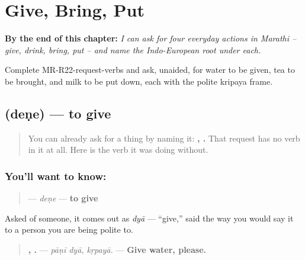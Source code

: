 
\chapter{Give, Bring, Put}
\label{ch:mr-request-verbs}

\begin{chapteropening}
\textbf{By the end of this chapter:} \emph{I can ask for four everyday actions in Marathi -- give, drink, bring, put -- and name the Indo-European root under each.}

Complete MR-R22-request-verbs and ask, unaided, for water to be given, tea to be brought, and milk to be put down, each with the polite kripaya frame.
\end{chapteropening}

\section[\texorpdfstring{\mr{देणे} (deṇe)}{देणे (deṇe)}]{ (deṇe) — to give}

\label{lesson:MR-C22-dene}



\begin{quote}
You can already ask for a thing by naming it: \textbf{, .} That request has no verb in it at all. Here is the verb it was doing without.
\end{quote}

\subsection*{You'll want to know: }
\begin{quote}
\textbf{} — \emph{deṇe} — \textbf{to give}
\end{quote}

Asked of someone, it comes out as \textbf{} \emph{dyā} — \textquotedblleft{}give,\textquotedblright{} said the way you would say it to a person you are being polite to.

\begin{quote}
\textbf{ , .} — \emph{pāṇī dyā, kṛpayā.} — \textbf{Give water, please.}
\end{quote}

